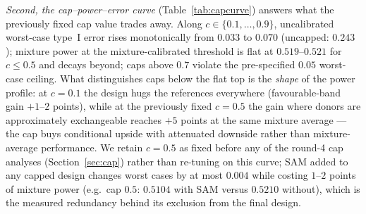 \documentclass[11pt]{article}
\begin{document}
\emph{Second, the cap--power--error curve} (Table~\ref{tab:capcurve})
answers what the previously fixed cap value trades away. Along
$c \in \{0.1,\dots,0.9\}$, uncalibrated worst-case type~I error rises
monotonically from $0.033$ to $0.070$ (uncapped: $0.243$); mixture power at
the mixture-calibrated threshold is flat at $0.519$--$0.521$ for
$c \le 0.5$ and decays beyond; caps above $0.7$ violate the pre-specified
$0.05$ worst-case ceiling. What distinguishes caps below the flat top is
the \emph{shape} of the power profile: at $c = 0.1$ the design hugs the
references everywhere (favourable-band gain $+1$--$2$ points), while at
the previously fixed $c = 0.5$ the gain where donors are approximately
exchangeable reaches $+5$ points at the same mixture average --- the cap
buys conditional upside with attenuated downside rather than
mixture-average performance. We retain $c = 0.5$ as fixed before any of the round-4 cap
analyses (Section~\ref{sec:cap}) rather than re-tuning on this curve; SAM added to
any capped design changes worst cases by at most $0.004$ while costing
$1$--$2$ points of mixture power (e.g.\ cap $0.5$: $0.5104$ with SAM versus
$0.5210$ without), which is the measured redundancy behind its exclusion
from the final design.
\end{document}
